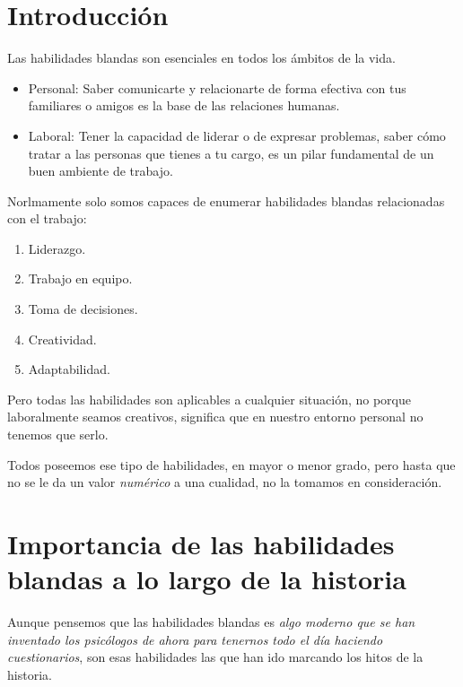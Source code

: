 
\section{Introducción}

Las habilidades blandas son esenciales en todos los ámbitos de la vida.

\begin{itemize}
	\item Personal: Saber comunicarte y relacionarte de forma efectiva con tus familiares o amigos es la base de las relaciones humanas.
	\item Laboral: Tener la capacidad de liderar o de expresar problemas, saber cómo tratar a las personas que tienes a tu cargo, es un pilar fundamental de un buen ambiente de trabajo.
\end{itemize}

Norlmamente solo somos capaces de enumerar habilidades blandas relacionadas con el trabajo:

\begin{enumerate}
	\item Liderazgo.
	\item Trabajo en equipo.
	\item	Toma de decisiones.
	\item Creatividad.
	\item Adaptabilidad.
\end{enumerate}

Pero todas las habilidades son aplicables a cualquier situación, no porque laboralmente seamos creativos, significa que en nuestro entorno personal no tenemos que serlo.

Todos poseemos ese tipo de habilidades, en mayor o menor grado, pero hasta que no se le da un valor \textit{numérico} a una cualidad, no la tomamos en consideración.	

\section{Importancia de las habilidades blandas a lo largo de la historia}

Aunque pensemos que las habilidades blandas es \textit{algo moderno que se han inventado los psicólogos de ahora para tenernos todo el día haciendo cuestionarios}, son esas habilidades las que han ido marcando los hitos de la historia.

